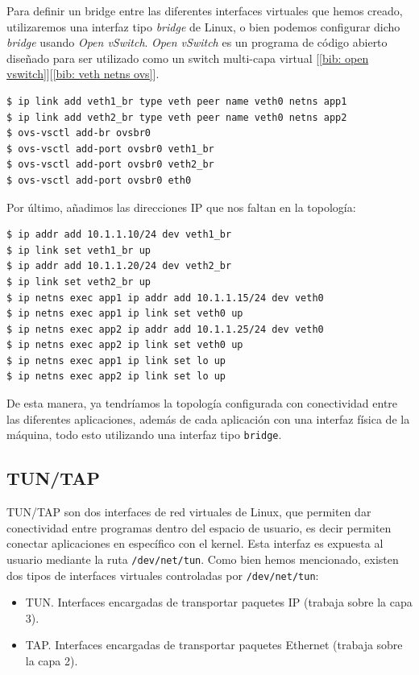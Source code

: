 \documentclass[12pt]{article}
\begin{document}
	\noindent Para definir un bridge entre las diferentes interfaces virtuales que hemos creado, utilizaremos una interfaz tipo \textit{bridge} de Linux, o bien podemos configurar dicho \textit{bridge} usando \textit{Open vSwitch}. \textit{Open vSwitch} es un programa de código abierto diseñado para ser utilizado como un switch multi-capa virtual [\ref{bib: open vswitch}][\ref{bib: veth netns ovs}].
	
	\begin{verbatim}
$ ip link add veth1_br type veth peer name veth0 netns app1
$ ip link add veth2_br type veth peer name veth0 netns app2
$ ovs-vsctl add-br ovsbr0
$ ovs-vsctl add-port ovsbr0 veth1_br
$ ovs-vsctl add-port ovsbr0 veth2_br
$ ovs-vsctl add-port ovsbr0 eth0
	\end{verbatim}

	\noindent Por último, añadimos las direcciones IP que nos faltan en la topología:
	
	\begin{verbatim}
$ ip addr add 10.1.1.10/24 dev veth1_br
$ ip link set veth1_br up
$ ip addr add 10.1.1.20/24 dev veth2_br
$ ip link set veth2_br up
$ ip netns exec app1 ip addr add 10.1.1.15/24 dev veth0
$ ip netns exec app1 ip link set veth0 up
$ ip netns exec app2 ip addr add 10.1.1.25/24 dev veth0
$ ip netns exec app2 ip link set veth0 up
$ ip netns exec app1 ip link set lo up
$ ip netns exec app2 ip link set lo up
	\end{verbatim}

	\noindent De esta manera, ya tendríamos la topología configurada con conectividad entre las diferentes aplicaciones, además de cada aplicación con una interfaz física de la máquina, todo esto utilizando una interfaz tipo \texttt{bridge}.

	\subsection{TUN/TAP}
	\noindent TUN/TAP son dos interfaces de red virtuales de Linux, que permiten dar conectividad entre programas dentro del espacio de usuario, es decir permiten conectar aplicaciones en específico con el kernel. Esta interfaz es expuesta al usuario mediante la ruta \texttt{/dev/net/tun}. Como bien hemos mencionado, existen dos tipos de interfaces virtuales controladas por \texttt{/dev/net/tun}: 
	
	\begin{itemize}
		\item TUN. Interfaces encargadas de transportar paquetes IP (trabaja sobre la capa 3).
		\item TAP. Interfaces encargadas de transportar paquetes Ethernet (trabaja sobre la capa 2).
	\end{itemize}
	
\end{document}
